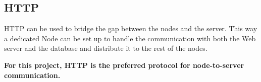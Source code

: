     \subsection{HTTP}
    HTTP can be used to bridge the gap between the nodes and the server.
    This way a dedicated Node can be set up to handle the communication
    with both the Web server and the database and distribute it to the 
    rest of the nodes.

    \vspace{1cm}
    \textbf{For this project, HTTP is the preferred protocol for 
    node-to-server communication.}



